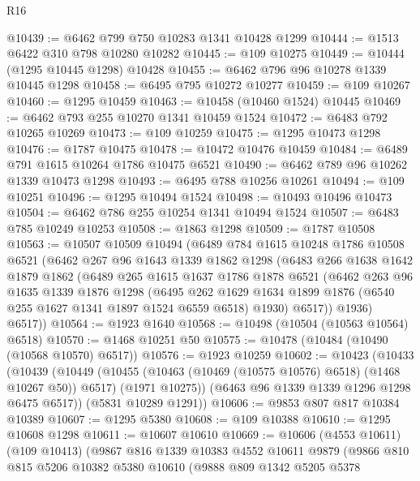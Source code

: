 \begin{lexlean}{R16}
\begin{coremodule}
@10439 := @6462 @799 @750 @10283 @1341 @10428 @1299
@10444 := @1513 @6422 @310 @798 @10280 @10282
@10445 := @109 @10275
@10449 := @10444 (@1295 @10445 @1298) @10428
@10455 := @6462 @796 @96 @10278 @1339 @10445 @1298
@10458 := @6495 @795 @10272 @10277
@10459 := @109 @10267
@10460 := @1295 @10459
@10463 := @10458 (@10460 @1524) @10445
@10469 := @6462 @793 @255 @10270 @1341 @10459 @1524
@10472 := @6483 @792 @10265 @10269
@10473 := @109 @10259
@10475 := @1295 @10473 @1298
@10476 := @1787 @10475
@10478 := @10472 @10476 @10459
@10484 := @6489 @791 @1615 @10264 @1786 @10475 @6521
@10490 := @6462 @789 @96 @10262 @1339 @10473 @1298
@10493 := @6495 @788 @10256 @10261
@10494 := @109 @10251
@10496 := @1295 @10494 @1524
@10498 := @10493 @10496 @10473
@10504 := @6462 @786 @255 @10254 @1341 @10494 @1524
@10507 := @6483 @785 @10249 @10253
@10508 := @1863 @1298
@10509 := @1787 @10508
@10563 := @10507
    @10509
    @10494
    (@6489
      @784
      @1615
      @10248
      @1786
      @10508
      @6521
      (@6462
        @267
        @96
        @1643
        @1339
        @1862
        @1298
        (@6483
          @266
          @1638
          @1642
          @1879
          @1862
          (@6489
            @265
            @1615
            @1637
            @1786
            @1878
            @6521
            (@6462
              @263
              @96
              @1635
              @1339
              @1876
              @1298
              (@6495
                @262
                @1629
                @1634
                @1899
                @1876
                (@6540 @255 @1627 @1341 @1897 @1524 @6559 @6518)
                @1930)
              @6517))
          @1936)
        @6517))
@10564 := @1923 @1640
@10568 := @10498 (@10504 (@10563 @10564) @6518)
@10570 := @1468 @10251 @50
@10575 := @10478 (@10484 (@10490 (@10568 @10570) @6517))
@10576 := @1923 @10259
@10602 := @10423
    (@10433
      (@10439
        (@10449
          (@10455 (@10463 (@10469 (@10575 @10576) @6518) (@1468 @10267 @50)) @6517)
          (@1971 @10275))
        (@6463 @96 @1339 @1339 @1296 @1298 @6475 @6517))
      (@5831 @10289 @1291))
@10606 := @9853 @807 @817 @10384 @10389
@10607 := @1295 @5380
@10608 := @109 @10388
@10610 := @1295 @10608 @1298
@10611 := @10607 @10610
@10669 := @10606
    (@4553 @10611)
    (@109 @10413)
    (@9867
      @816
      @1339
      @10383
      @4552
      @10611
      @9879
      (@9866
        @810
        @815
        @5206
        @10382
        @5380
        @10610
        (@9888
          @809
          @1342
          @5205
          @5378

\end{coremodule}
\end{lexlean}
